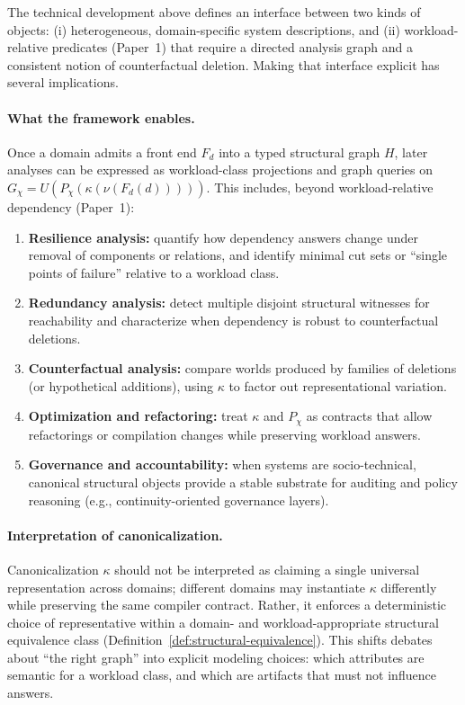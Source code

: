 \documentclass[11pt]{article}
\begin{document}
The technical development above defines an interface between two kinds of objects: (i) heterogeneous, domain-specific system descriptions, and (ii) workload-relative predicates (Paper~1) that require a directed analysis graph and a consistent notion of counterfactual deletion. Making that interface explicit has several implications.

\paragraph{What the framework enables.}
Once a domain admits a front end $F_d$ into a typed structural graph $H$, later analyses can be expressed as workload-class projections and graph queries on $G_\chi=U(P_\chi(\kappa(\nu(F_d(d)))))$. This includes, beyond workload-relative dependency (Paper~1):
\begin{enumerate}[label=(\roman*),leftmargin=*]
  \item \textbf{Resilience analysis:} quantify how dependency answers change under removal of components or relations, and identify minimal cut sets or ``single points of failure'' relative to a workload class.
  \item \textbf{Redundancy analysis:} detect multiple disjoint structural witnesses for reachability and characterize when dependency is robust to counterfactual deletions.
  \item \textbf{Counterfactual analysis:} compare worlds produced by families of deletions (or hypothetical additions), using $\kappa$ to factor out representational variation.
  \item \textbf{Optimization and refactoring:} treat $\kappa$ and $P_\chi$ as contracts that allow refactorings or compilation changes while preserving workload answers.
  \item \textbf{Governance and accountability:} when systems are socio-technical, canonical structural objects provide a stable substrate for auditing and policy reasoning (e.g., continuity-oriented governance layers).
\end{enumerate}

\paragraph{Interpretation of canonicalization.}
Canonicalization $\kappa$ should not be interpreted as claiming a single universal representation across domains; different domains may instantiate $\kappa$ differently while preserving the same compiler contract. Rather, it enforces a deterministic choice of representative within a domain- and workload-appropriate structural equivalence class (Definition~\ref{def:structural-equivalence}). This shifts debates about ``the right graph'' into explicit modeling choices: which attributes are semantic for a workload class, and which are artifacts that must not influence answers.
\end{document}
